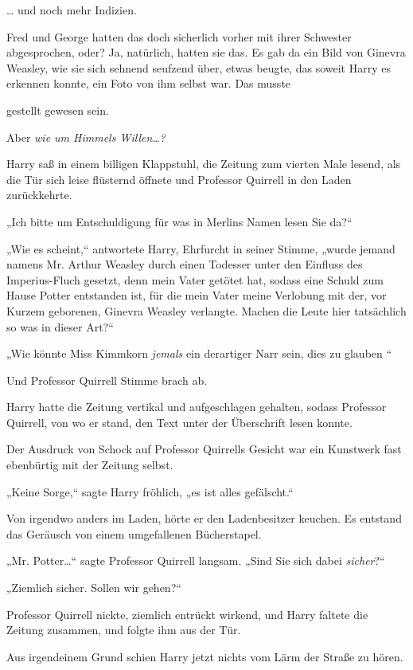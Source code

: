 {… und noch mehr Indizien.

Fred und George hatten das doch sicherlich vorher mit ihrer Schwester abgesprochen, oder? Ja, natürlich, hatten sie das. Es gab da ein Bild von Ginevra Weasley, wie sie sich sehnend seufzend über, etwas beugte, das soweit Harry es erkennen konnte, ein Foto von ihm selbst war. Das musste

gestellt gewesen sein.

Aber \emph{wie um Himmels Willen…?}

Harry saß in einem billigen Klappstuhl, die Zeitung zum vierten Male lesend, als die Tür sich leise flüsternd öffnete und Professor Quirrell in den Laden zurückkehrte.

„Ich bitte um Entschuldigung für \later was in Merlins Namen lesen Sie da?“

„Wie es scheint,“ antwortete Harry, Ehrfurcht in seiner Stimme, „wurde jemand namens Mr. Arthur Weasley durch einen Todesser unter den Einfluss des Imperius-Fluch gesetzt, denn mein Vater getötet hat, sodass eine Schuld zum Hause Potter entstanden ist, für die mein Vater meine Verlobung mit der, vor Kurzem geborenen, Ginevra Weasley verlangte. Machen die Leute hier tatsächlich so was in dieser Art?“

„Wie könnte Miss Kimmkorn \emph{jemals} ein derartiger Narr sein, dies zu glauben \later“

Und Professor Quirrell Stimme brach ab.

Harry hatte die Zeitung vertikal und aufgeschlagen gehalten, sodass Professor Quirrell, von wo er stand, den Text unter der Überschrift lesen konnte.

Der Ausdruck von Schock auf Professor Quirrells Gesicht war ein Kunstwerk fast ebenbürtig mit der Zeitung selbst.

„Keine Sorge,“ sagte Harry fröhlich, „es ist alles gefälscht.“

Von irgendwo anders im Laden, hörte er den Ladenbesitzer keuchen. Es entstand das Geräusch von einem umgefallenen Bücherstapel.

„Mr. Potter…“ sagte Professor Quirrell langsam. „Sind Sie sich dabei \emph{sicher}?“

„Ziemlich sicher. Sollen wir gehen?“

Professor Quirrell nickte, ziemlich entrückt wirkend, und Harry faltete die Zeitung zusammen, und folgte ihm aus der Tür.

Aus irgendeinem Grund schien Harry jetzt nichts vom Lärm der Straße zu hören.

}
